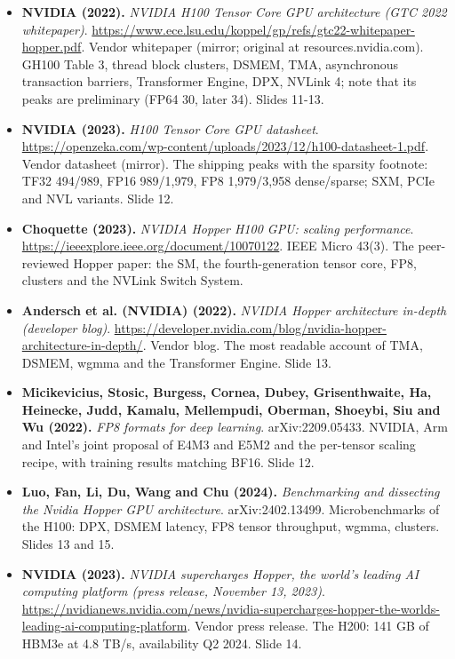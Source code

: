 \begin{itemize}[leftmargin=1.2em,itemsep=3pt]\sloppy
\item \textbf{NVIDIA (2022).} \textit{NVIDIA H100 Tensor Core GPU architecture (GTC 2022 whitepaper)}. \url{https://www.ece.lsu.edu/koppel/gp/refs/gtc22-whitepaper-hopper.pdf}. Vendor whitepaper (mirror; original at resources.nvidia.com). GH100 Table 3, thread block clusters, DSMEM, TMA, asynchronous transaction barriers, Transformer Engine, DPX, NVLink 4; note that its peaks are preliminary (FP64 30, later 34). Slides 11-13.
\item \textbf{NVIDIA (2023).} \textit{H100 Tensor Core GPU datasheet}. \url{https://openzeka.com/wp-content/uploads/2023/12/h100-datasheet-1.pdf}. Vendor datasheet (mirror). The shipping peaks with the sparsity footnote: TF32 494/989, FP16 989/1,979, FP8 1,979/3,958 dense/sparse; SXM, PCIe and NVL variants. Slide 12.
\item \textbf{Choquette (2023).} \textit{NVIDIA Hopper H100 GPU: scaling performance}. \url{https://ieeexplore.ieee.org/document/10070122}. IEEE Micro 43(3). The peer-reviewed Hopper paper: the SM, the fourth-generation tensor core, FP8, clusters and the NVLink Switch System.
\item \textbf{Andersch et al. (NVIDIA) (2022).} \textit{NVIDIA Hopper architecture in-depth (developer blog)}. \url{https://developer.nvidia.com/blog/nvidia-hopper-architecture-in-depth/}. Vendor blog. The most readable account of TMA, DSMEM, wgmma and the Transformer Engine. Slide 13.
\item \textbf{Micikevicius, Stosic, Burgess, Cornea, Dubey, Grisenthwaite, Ha, Heinecke, Judd, Kamalu, Mellempudi, Oberman, Shoeybi, Siu and Wu (2022).} \textit{FP8 formats for deep learning}. arXiv:2209.05433. NVIDIA, Arm and Intel's joint proposal of E4M3 and E5M2 and the per-tensor scaling recipe, with training results matching BF16. Slide 12.
\item \textbf{Luo, Fan, Li, Du, Wang and Chu (2024).} \textit{Benchmarking and dissecting the Nvidia Hopper GPU architecture}. arXiv:2402.13499. Microbenchmarks of the H100: DPX, DSMEM latency, FP8 tensor throughput, wgmma, clusters. Slides 13 and 15.
\item \textbf{NVIDIA (2023).} \textit{NVIDIA supercharges Hopper, the world's leading AI computing platform (press release, November 13, 2023)}. \url{https://nvidianews.nvidia.com/news/nvidia-supercharges-hopper-the-worlds-leading-ai-computing-platform}. Vendor press release. The H200: 141 GB of HBM3e at 4.8 TB/s, availability Q2 2024. Slide 14.

\end{itemize}
